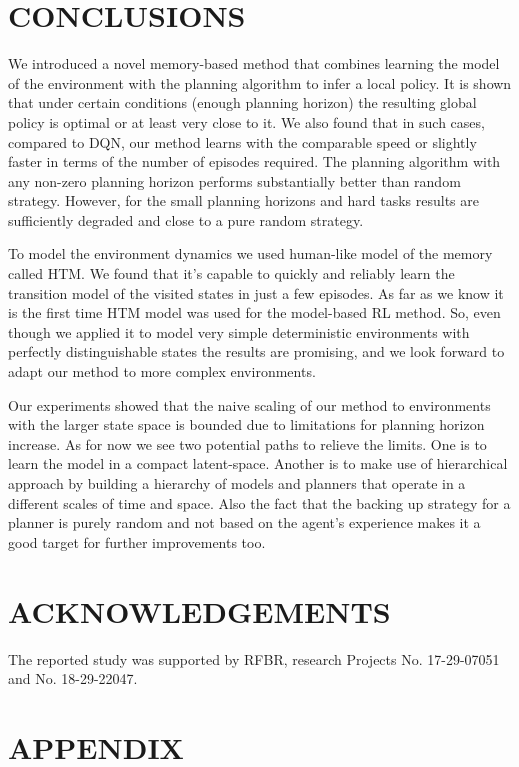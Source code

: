 \documentclass[a4paper,twoside]{article}
\begin{document}
\section{\uppercase{Conclusions}}

We introduced a novel memory-based method that combines learning the model of the environment with the planning algorithm to infer a local policy. It is shown that under certain conditions (enough planning horizon) the resulting global policy is optimal or at least very close to it. We also found that in such cases, compared to DQN, our method learns with the comparable speed or slightly faster in terms of the number of episodes required. The planning algorithm with any non-zero planning horizon performs substantially better than random strategy. However, for the small planning horizons and hard tasks results are sufficiently degraded and close to a pure random strategy.

To model the environment dynamics we used human-like model of the memory called HTM. We found that it's capable to quickly and reliably learn the transition model of the visited states in just a few episodes. As far as we know it is the first time HTM model was used for the model-based RL method. So, even though we applied it to model very simple deterministic environments with perfectly distinguishable states the results are promising, and we look forward to adapt our method to more complex environments.

Our experiments showed that the naive scaling of our method to environments with the larger state space is bounded due to limitations for planning horizon increase. As for now we see two potential paths to relieve the limits. One is to learn the model in a compact latent-space. Another is to make use of hierarchical approach by building a hierarchy of models and planners that operate in a different scales of time and space. Also the fact that the backing up strategy for a planner is purely random and not based on the agent's experience makes it a good target for further improvements too.

\section*{\uppercase{Acknowledgements}}
The reported study was supported by RFBR, research Projects No. 17-29-07051 and No. 18-29-22047.

{\small}

\section*{\uppercase{Appendix}}
\end{document}
